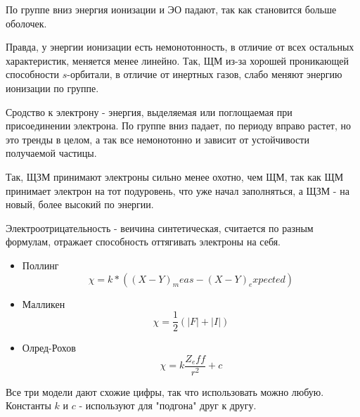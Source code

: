 \documentclass[11pt]{article}
\begin{document}
По группе вниз энергия ионизации и ЭО падают, так как становится больше оболочек. 

Правда, у энергии ионизации есть немонотонность, в отличие от всех остальных характеристик, меняется менее линейно. Так, ЩМ из-за хорошей проникающей способности $s$-орбитали, в отличие от инертных газов, слабо меняют энергию ионизации по группе.

Сродство к электрону - энергия, выделяемая или поглощаемая при присоединении электрона. По группе вниз падает, по периоду вправо растет, но это тренды в целом, а так все немонотонно и зависит от устойчивости получаемой частицы.

Так, ЩЗМ принимают электроны сильно менее охотно, чем ЩМ, так как ЩМ принимает электрон на тот подуровень, что уже начал заполняться, а ЩЗМ - на новый, более высокий по энергии.

Электроотрицательность - веичина синтетическая, считается по разным формулам, отражает способность оттягивать электроны на себя.
\begin{itemize}
\item Поллинг
$$\chi = k*(\left(X-Y\right)_meas - \left(X-Y\right)_expected)$$
\item Малликен
$$\chi = \frac 12 \left(|F| + |I|\right)$$
\item Олред-Рохов
$$\chi = k\frac{Z_eff}{r^2} + c$$
\end{itemize}
Все три модели дают схожие цифры, так что использовать можно любую. Константы $k$ и $c$ - используют для "подгона" друг к другу.
\end{document}
